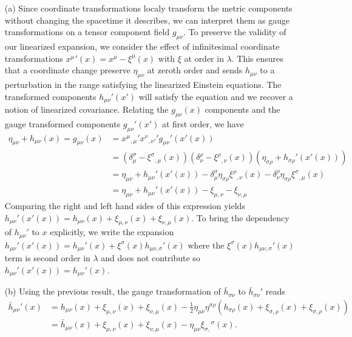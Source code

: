 \documentclass[10pt, a4paper]{article}
\begin{document}
\begin{enumerate}
  \item[(a)] Since coordinate transformations localy transform the metric components without changing the spacetime it describes, we can interpret them as gauge transformations on a tensor component field $g_{\mu\nu}$. To preserve the validity of our linearized expansion, we consider the effect of infinitesimal coordinate transformations $x^{\mu}{}'(x) = x^{\mu} - \xi^{\mu}(x)$ with $\xi$ at order in $\lambda$. This ensures that a coordinate change preserve $\eta_{\mu\nu}$ at zeroth order and sends $h_{\mu\nu}$ to a perturbation in the range satisfying the linearized Einstein equations.  The transformed components $h_{\mu\nu}'(x')$ will satisfy the equation and we recover a notion of linearized covariance. Relating the $g_{\mu\nu}(x)$ components and the gauge transformed components $g_{\mu\nu}'(x')$ at first order, we have 
  \begin{align*}
    \eta_{\mu\nu} + h_{\mu\nu}(x) = g_{\mu\nu}(x) &= x^{\mu}{}_{,\mu}' x^{\nu}{}_{,\nu'}' g_{\mu\nu}'(x'(x))\\
    &= (\delta^{\sigma}_\mu - \xi^{\sigma}{}_{,\mu}(x))(\delta^{\rho}_\nu- \xi^{\rho}{}_{,\nu}(x))(\eta_{\sigma\rho} + h_{\sigma\rho}'(x'(x)))\\
    &= \eta_{\mu\nu} + h_{\mu\nu}'(x'(x)) - \delta^{\sigma}_\mu \eta_{\sigma \rho} \xi^{\rho}{}_{,\nu}(x) - \delta^{\rho}_\nu \eta_{\sigma \rho} \xi^{\sigma}{}_{,\mu}(x)\\
    &= \eta_{\mu\nu} + h_{\mu\nu}'(x'(x)) - \xi_{\mu,\nu} - \xi_{\nu,\mu}
  \end{align*}
  Comparing the right and left hand sides of this expression yields $h_{\mu\nu}'(x'(x)) = h_{\mu\nu}(x) + \xi_{\mu,\nu}(x) + \xi_{\nu,\mu}(x)$. To bring the dependency of $h_{\mu\nu}'$ to $x$ explicitly, we write the expansion $h_{\mu\nu}'(x'(x)) = h_{\mu\nu}'(x) + \xi^{\sigma}(x) h_{\mu\nu, \sigma}'(x)$ where the $\xi^{\sigma}(x) h_{\mu\nu, \sigma}'(x)$ term is second order in $\lambda$ and does not contribute so $h_{\mu\nu}'(x'(x)) = h_{\mu\nu}'(x)$.
  \item[(b)] Using the previous result, the gauge transformation of $\bar{h}_{\sigma \nu}$ to $\bar{h}_{\sigma \nu}'$ reads
  \begin{align*}
    \bar{h}_{\mu \nu}'(x) &= h_{\mu\nu}(x) + \xi_{\mu,\nu}(x) + \xi_{\nu,\mu}(x) - \frac{1}{2}\eta_{\mu \nu} \eta^{\sigma \rho} (h_{\sigma\rho}(x) + \xi_{\sigma,\rho}(x) + \xi_{\sigma,\rho}(x))\\
    &= \bar{h}_{\mu\nu}(x) + \xi_{\mu,\nu}(x) + \xi_{\nu,\mu}(x) - \eta_{\mu \nu} \xi_{\sigma,}{}^{\sigma}(x).

\end{align*}
\end{enumerate}
\end{document}

